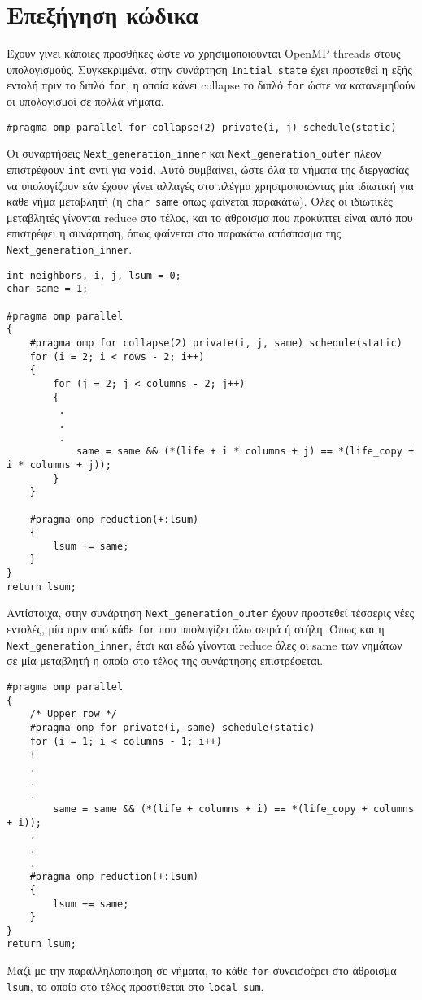 \section{Επεξήγηση κώδικα}
Έχουν γίνει κάποιες προσθήκες ώστε να χρησιμοποιούνται OpenMP threads στους υπολογισμούς. Συγκεκριμένα, στην συνάρτηση \texttt{Initial_state} έχει προστεθεί η εξής εντολή πριν το διπλό \texttt{for}, η οποία κάνει collapse το διπλό \texttt{for} ώστε να κατανεμηθούν οι υπολογισμοί σε πολλά νήματα. \\
\begin{tcolorbox}
\texttt{#pragma}\texttt{ omp parallel for collapse(2) private(i, j) schedule(static)}
\end{tcolorbox}
\begin{multicols}{2}
Οι συναρτήσεις \texttt{Next_generation_inner} και \texttt{Next_generation_outer} πλέον επιστρέφουν \texttt{int} αντί για \texttt{void}. Αυτό συμβαίνει, ώστε όλα τα νήματα της διεργασίας να υπολογίζουν εάν έχουν γίνει αλλαγές στο πλέγμα χρησιμοποιώντας μία ιδιωτική για κάθε νήμα μεταβλητή (η \texttt{char same} όπως φαίνεται παρακάτω). Όλες οι ιδιωτικές μεταβλητές γίνονται reduce στο τέλος, και το άθροισμα που προκύπτει είναι αυτό που επιστρέφει η συνάρτηση, όπως φαίνεται στο παρακάτω απόσπασμα της \texttt{Next_generation_inner}. 
\end{multicols}
\begin{tcolorbox}
\begin{verbatim}
int neighbors, i, j, lsum = 0;
char same = 1;

#pragma omp parallel
{
    #pragma omp for collapse(2) private(i, j, same) schedule(static)
    for (i = 2; i < rows - 2; i++)
    {
        for (j = 2; j < columns - 2; j++)
        {
         .
         .
         .
            same = same && (*(life + i * columns + j) == *(life_copy + i * columns + j));
        }
    }

    #pragma omp reduction(+:lsum)
    {
        lsum += same;
    }
}
return lsum;       
\end{verbatim}
\end{tcolorbox}
Αντίστοιχα, στην συνάρτηση \texttt{Next_generation_outer} έχουν προστεθεί τέσσερις νέες εντολές, μία πριν από κάθε \texttt{for} που υπολογίζει άλω σειρά ή στήλη. Όπως και η \texttt{Next_generation_inner}, έτσι και εδώ γίνονται reduce όλες οι same των νημάτων σε μία μεταβλητή η οποία στο τέλος της συνάρτησης επιστρέφεται. \\
\begin{tcolorbox}
\begin{verbatim}
#pragma omp parallel
{
    /* Upper row */
    #pragma omp for private(i, same) schedule(static)
    for (i = 1; i < columns - 1; i++)
    {
    .
    .
    .
        same = same && (*(life + columns + i) == *(life_copy + columns + i));
    .
    .
    .
    #pragma omp reduction(+:lsum)
    {
        lsum += same;
    }
}
return lsum;
\end{verbatim}
\end{tcolorbox}
Μαζί με την παραλληλοποίηση σε νήματα, το κάθε \texttt{for} συνεισφέρει στο άθροισμα \texttt{lsum}, το οποίο στο τέλος προστίθεται στο \texttt{local_sum}.


